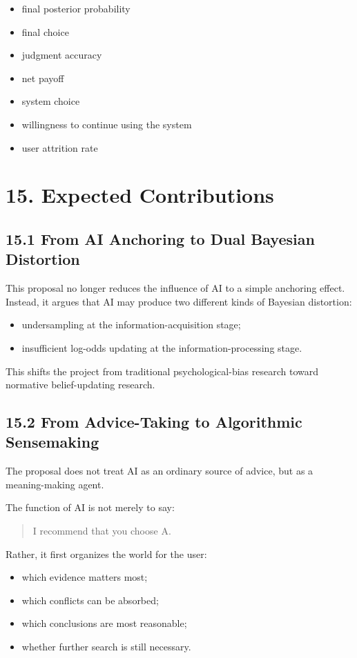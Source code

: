 \begin{itemize}[leftmargin=1.5em]
\item final posterior probability
\item final choice
\item judgment accuracy
\item net payoff
\item system choice
\item willingness to continue using the system
\item user attrition rate
\end{itemize}

\section*{15. Expected Contributions}

\subsection*{15.1 From AI Anchoring to Dual Bayesian Distortion}

This proposal no longer reduces the influence of AI to a simple anchoring effect. Instead, it argues that AI may produce two different kinds of Bayesian distortion:
\begin{itemize}[leftmargin=1.5em]
\item undersampling at the information-acquisition stage;
\item insufficient log-odds updating at the information-processing stage.
\end{itemize}

This shifts the project from traditional psychological-bias research toward normative belief-updating research.

\subsection*{15.2 From Advice-Taking to Algorithmic Sensemaking}

The proposal does not treat AI as an ordinary source of advice, but as a meaning-making agent.

The function of AI is not merely to say:
\begin{quote}
I recommend that you choose A.
\end{quote}

Rather, it first organizes the world for the user:
\begin{itemize}[leftmargin=1.5em]
\item which evidence matters most;
\item which conflicts can be absorbed;
\item which conclusions are most reasonable;
\item whether further search is still necessary.
\end{itemize}

